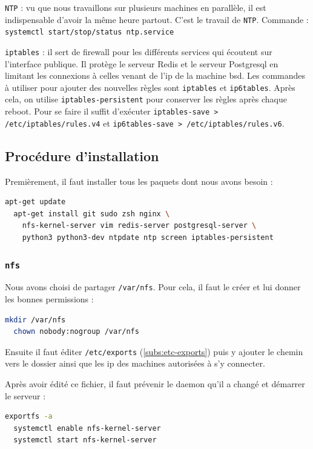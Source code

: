 \documentclass[10pt,a4paper]{article}
\begin{document}
\texttt{NTP} : vu que nous travaillons sur plusieurs machines en parallèle, il est indispensable d'avoir la même heure partout.
C'est le travail de \texttt{NTP}.
Commande : \texttt{systemctl start/stop/status ntp.service}

\texttt{iptables} : il sert de firewall pour les différents services qui écoutent sur l'interface publique.
Il protège le serveur Redis et le serveur Postgresql en limitant les connexions à celles venant de l'ip de la machine bsd.
Les commandes à utiliser pour ajouter des nouvelles règles sont \texttt{iptables} et \texttt{ip6tables}.
Après cela, on utilise \texttt{iptables-persistent} pour conserver les règles après chaque reboot. Pour se faire il suffit d'exécuter \texttt{iptables-save > /etc/iptables/rules.v4} et \texttt{ip6tables-save > /etc/iptables/rules.v6}.


\subsection{Procédure d'installation}

Premièrement, il faut installer tous les paquets dont nous avons besoin :
\begin{lstlisting}[language=bash]
  apt-get update
  apt-get install git sudo zsh nginx \
    nfs-kernel-server vim redis-server postgresql-server \
    python3 python3-dev ntpdate ntp screen iptables-persistent
\end{lstlisting}

\subsubsection{\texttt{nfs}}

Nous avons choisi de partager \texttt{/var/nfs}. Pour cela, il faut le créer et lui donner les bonnes permissions :

\begin{lstlisting}[language=bash]
  mkdir /var/nfs
  chown nobody:nogroup /var/nfs
\end{lstlisting}

Ensuite il faut éditer \texttt{/etc/exports} (\ref{subs:etc-exports}) puis y ajouter le chemin vers
le dossier ainsi que les ip des machines autorisées à s'y connecter.

Après avoir édité ce fichier, il faut prévenir le daemon qu'il a changé et démarrer le serveur :
\begin{lstlisting}[language=bash]
  exportfs -a
  systemctl enable nfs-kernel-server
  systemctl start nfs-kernel-server
\end{lstlisting}
\end{document}
